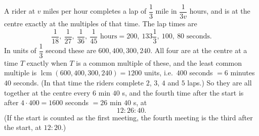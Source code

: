 A rider at $v$ miles per hour completes a lap of $\dfrac{1}{3}$ mile in $\dfrac{1}{3v}$ hours, and is at the centre exactly at the multiples of that time. The lap times are
\[
\dfrac{1}{18},\ \dfrac{1}{27},\ \dfrac{1}{36},\ \dfrac{1}{45}\text{ hours}=200,\ 133\dfrac{1}{3},\ 100,\ 80\text{ seconds}.
\]
In units of $\dfrac{1}{3}$ second these are $600,400,300,240$. All four are at the centre at a time $T$ exactly when $T$ is a common multiple of these, and the least common multiple is $\operatorname{lcm}(600,400,300,240)=1200$ units, i.e.\ $400$ seconds $=6$ minutes $40$ seconds. (In that time the riders complete $2$, $3$, $4$ and $5$ laps.) So they are all together at the centre every $6$ min $40$ s, and the fourth time after the start is after $4\cdot400=1600$ seconds $=26$ min $40$ s, at
\[
\boxed{12{:}26{:}40}.
\]
(If the start is counted as the first meeting, the fourth meeting is the third after the start, at $12{:}20$.)
